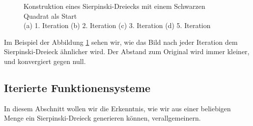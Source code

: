 \begin{figure}	
	\centering
	\caption{Konstruktion eines Sierpinski-Dreiecks mit einem Schwarzen Quadrat als Start\\
		(a) 1. Iteration (b) 2. Iteration (c) 3. Iteration (d) 5. Iteration}
	\label{ifs:sierpconst}
\end{figure}
Im Beispiel der Abbildung \ref{ifs:sierpconst} sehen wir, wie das Bild nach jeder Iteration dem Sierpinski-Dreieck ähnlicher wird.
Der Abstand zum Original wird immer kleiner, und konvergiert gegen null.

\subsection{Iterierte Funktionensysteme
\label{ifs:subsection:IteratedFunktionensysteme}}
In diesem Abschnitt wollen wir die Erkenntnis, wie wir aus einer beliebigen Menge ein Sierpinski-Dreieck generieren können, verallgemeinern.


